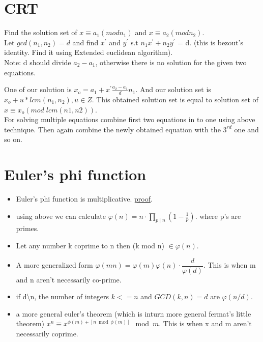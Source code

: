 \documentclass[../Notes.tex]{subfiles}
\begin{document}
\section{CRT}
Find the solution set of $x\equiv a_1(mod n_1)$ and $x\equiv a_2(mod n_2)$.\\

Let $gcd(n_1,n_2)=d$ and find $x^\prime$ and $y^\prime$ s.t $n_1x^\prime + n_2y^\prime$ = d. (this is bezout's identity. Find it using Extended euclidean algorithm).\\
Note: d should divide $a_2-a_1$, otherwise there is no solution for the given two equations.

One of our solution is $x_o=a_1+x^\prime \frac{a_2-a_1}{d}n_1$. And our solution set is \\ $x_o+u*lcm(n_1,n_2), u\in Z$. This obtained solution set is equal to solution set of $x\equiv x_o(mod\;lcm(n1,n2))$.\\

For solving multiple equations combine first two equations in to one using above technique. Then again combine the newly obtained equation with the $3^{rd}$ one and so on.

\section{Euler's phi function}
\begin{itemize}
	\item Euler's phi function is multiplicative. \href{https://proofwiki.org/w/index.php?title=Euler_Phi_Function_is_Multiplicative&oldid=373969}{proof}.
	\item using above we can calculate $\varphi(n) = n\cdot \prod_{p\mid n}\left(1 - \frac1p\right).$ where p's are primes.
	\item Let any number k coprime to n then (k mod n) $\in \varphi(n)$.
	\item A more generalized form $\varphi (mn) = \varphi (m) \varphi (n) \cdot \dfrac{d}{\varphi (d)}$. This is when m and n aren't necessarily co-prime.
	\item if d\textbackslash n, the number of integers $k<=n$ and $GCD(k,n)=d$ are $\varphi(n/d)$.
	\item a more general euler's theorem (which is inturn more general fermat's little theorem) $x^{n}\equiv x^{\phi(m)+[n \bmod \phi(m)]} \mod m$. This is when x and m aren't necessarily coprime.
\end{itemize}
\end{document}
